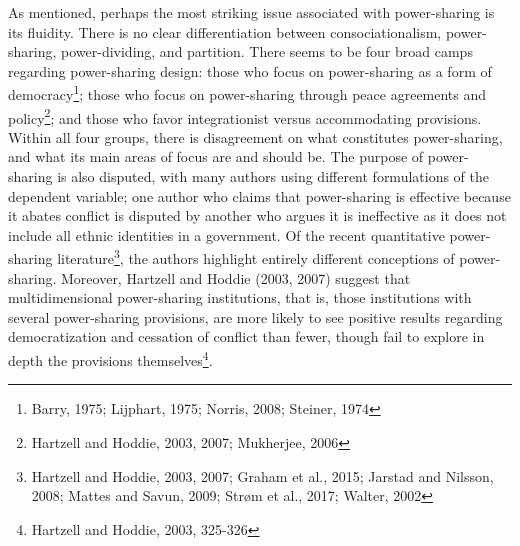 \documentclass[12pt]{article}
\begin{document}
As mentioned, perhaps the most striking issue associated with power-sharing is its fluidity. There is no clear differentiation between consociationalism, power-sharing, power-dividing, and partition. There seems to be four broad camps regarding power-sharing design: those who focus on power-sharing as a form of democracy\footnote{Barry, 1975; Lijphart, 1975; Norris, 2008; Steiner, 1974}; those who focus on power-sharing through peace agreements and policy\footnote{Hartzell and Hoddie, 2003, 2007; Mukherjee, 2006}; and those who favor integrationist versus accommodating provisions. Within all four groups, there is disagreement on what constitutes power-sharing, and what its main areas of focus are and should be. The purpose of power-sharing is also disputed, with many authors using different formulations of the dependent variable; one author who claims that power-sharing is effective because it abates conflict is disputed by another who argues it is ineffective as it does not include all ethnic identities in a government. Of the recent quantitative power-sharing literature\footnote{Hartzell and Hoddie, 2003, 2007; Graham et al., 2015; Jarstad and Nilsson, 2008; Mattes and Savun, 2009; Strøm et al., 2017; Walter, 2002}, the authors highlight entirely different conceptions of power-sharing. Moreover, Hartzell and Hoddie (2003, 2007) suggest that multidimensional power-sharing institutions, that is, those institutions with several power-sharing provisions, are more likely to see positive results regarding democratization and cessation of conflict than fewer, though fail to explore in depth the provisions themselves\footnote{Hartzell and Hoddie, 2003, 325-326}. 
\end{document}
